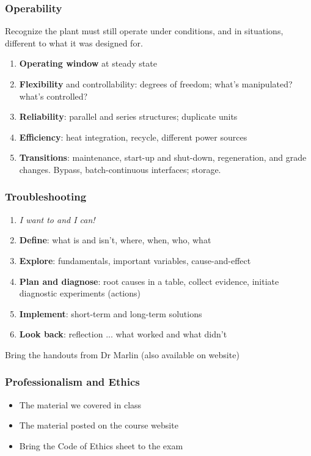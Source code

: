 \begin{frame}\frametitle{Operability}
	\begin{exampleblock}{}
		Recognize the plant must still operate under conditions, and in situations, different to what it was designed for.
	\end{exampleblock}
	\begin{enumerate}
		\item	\textbf{Operating window} at steady state
		\item	\textbf{Flexibility} and controllability: degrees of freedom; what's manipulated? what's controlled?
		\item	\textbf{Reliability}: parallel and series structures; duplicate units
		\item	\textbf{Efficiency}: heat integration, recycle, different power sources
		\item	\textbf{Transitions}: maintenance, start-up and shut-down, regeneration, and grade changes. Bypass, batch-continuous interfaces; storage.
	\end{enumerate}
\end{frame}

\begin{frame}\frametitle{Troubleshooting}
	\begin{enumerate}
		\item	\emph{I want to and I can!}
		\item	\textbf{Define}: what is and isn't, where, when, who, what
		\item	\textbf{Explore}: fundamentals, important variables, cause-and-effect
		\item	\textbf{Plan and diagnose}: root causes in a table, collect evidence, initiate diagnostic experiments (actions)
		\item	\textbf{Implement}: short-term and long-term solutions
		\item	\textbf{Look back}: reflection ... what worked and what didn't
	\end{enumerate}
	\vspace{12pt}
	Bring the handouts from Dr Marlin (also available on website)
\end{frame}

\begin{frame}\frametitle{Professionalism and Ethics}
	\begin{itemize}
		\item	The material we covered in class
		\item	The material posted on the course website
		\item	{\color{red} Bring the Code of Ethics sheet to the exam}
	\end{itemize}
\end{frame}


